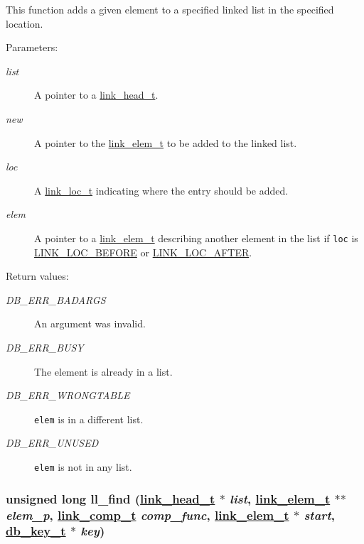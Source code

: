 This function adds a given element to a specified linked list in the specified location.\begin{Desc}
\item[Parameters: ]\par
\begin{description}
\item[{\em 
list}]A pointer to a \hyperlink{group__dbprim__link_a0}{link\_\-head\_\-t}. \item[{\em 
new}]A pointer to the \hyperlink{group__dbprim__link_a1}{link\_\-elem\_\-t} to be added to the linked list. \item[{\em 
loc}]A \hyperlink{group__dbprim__link_a4}{link\_\-loc\_\-t} indicating where the entry should be added. \item[{\em 
elem}]A pointer to a \hyperlink{group__dbprim__link_a1}{link\_\-elem\_\-t} describing another element in the list if {\tt loc} is \hyperlink{group__dbprim__link_a26a134}{LINK\_\-LOC\_\-BEFORE} or \hyperlink{group__dbprim__link_a26a135}{LINK\_\-LOC\_\-AFTER}.\end{description}
\end{Desc}
\begin{Desc}
\item[Return values: ]\par
\begin{description}
\item[{\em 
DB\_\-ERR\_\-BADARGS}]An argument was invalid. \item[{\em 
DB\_\-ERR\_\-BUSY}]The element is already in a list. \item[{\em 
DB\_\-ERR\_\-WRONGTABLE}]{\tt elem} is in a different list. \item[{\em 
DB\_\-ERR\_\-UNUSED}]{\tt elem} is not in any list. \end{description}
\end{Desc}
\hypertarget{group__dbprim__link_a9}{
\subsubsection[ll\_\-find]{\setlength{\rightskip}{0pt plus 5cm}unsigned long ll\_\-find (\hyperlink{group__dbprim__link_a0}{link\_\-head\_\-t} $\ast$ {\em list}, \hyperlink{group__dbprim__link_a1}{link\_\-elem\_\-t} $\ast$$\ast$ {\em elem\_\-p}, \hyperlink{group__dbprim__link_a3}{link\_\-comp\_\-t} {\em comp\_\-func}, \hyperlink{group__dbprim__link_a1}{link\_\-elem\_\-t} $\ast$ {\em start}, \hyperlink{group__dbprim_a0}{db\_\-key\_\-t} $\ast$ {\em key})}}
\label{group__dbprim__link_a9}


